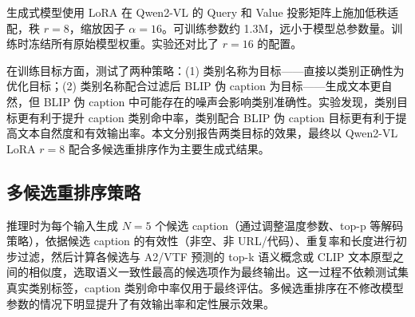 生成式模型使用 LoRA 在 Qwen2-VL 的 Query 和 Value 投影矩阵上施加低秩适配，秩 $r=8$，缩放因子 $\alpha=16$。可训练参数约 1.3M，远小于模型总参数量。训练时冻结所有原始模型权重。实验还对比了 $r=16$ 的配置。

在训练目标方面，测试了两种策略：(1) 类别名称为目标——直接以类别正确性为优化目标；(2) 类别名称配合过滤后 BLIP 伪 caption 为目标——生成文本更自然，但 BLIP 伪 caption 中可能存在的噪声会影响类别准确性。实验发现，类别目标更有利于提升 caption 类别命中率，类别配合 BLIP 伪 caption 目标更有利于提高文本自然度和有效输出率。本文分别报告两类目标的效果，最终以 Qwen2-VL LoRA $r=8$ 配合多候选重排序作为主要生成式结果。

\subsection{多候选重排序策略}

推理时为每个输入生成 $N=5$ 个候选 caption（通过调整温度参数、top-p 等解码策略），依据候选 caption 的有效性（非空、非 URL/代码）、重复率和长度进行初步过滤，然后计算各候选与 A2/VTF 预测的 top-k 语义概念或 CLIP 文本原型之间的相似度，选取语义一致性最高的候选项作为最终输出。这一过程不依赖测试集真实类别标签，caption 类别命中率仅用于最终评估。多候选重排序在不修改模型参数的情况下明显提升了有效输出率和定性展示效果。
